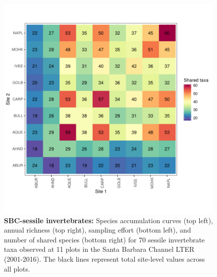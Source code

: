 \documentclass[11pt, oneside]{article}
\begin{document}
\begin{figure}[h!]
\includegraphics[scale = 0.4]{sbc-sessileInverts-castorani_spp_shared.pdf}
\caption{{\bf SBC-sessile invertebrates:} Species accumulation curves (top left),  annual richness (top right), sampling effort (bottom left), and number of shared species (bottom right)  for 70 sessile invertebrate taxa observed at 11 plots in the Santa Barbara Channel LTER (2001-2016). The black lines represent total site-level values across all plots.}
\label{sbc-sessileInverts}
\end{figure}
\end{document}
